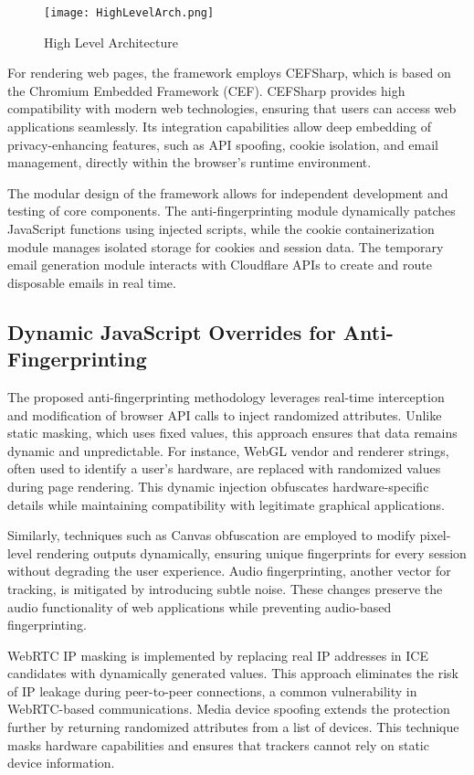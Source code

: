 \documentclass[conference]{IEEEtran}
\begin{document}
\begin{figure}[htbp]
\centerline{\texttt{[image: HighLevelArch.png]}}
\caption{High Level Architecture}
\label{fig}
\end{figure}

For rendering web pages, the framework employs CEFSharp, which is based on the Chromium Embedded Framework (CEF). CEFSharp provides high compatibility with modern web technologies, ensuring that users can access web applications seamlessly. Its integration capabilities allow deep embedding of privacy-enhancing features, such as API spoofing, cookie isolation, and email management, directly within the browser’s runtime environment.

The modular design of the framework allows for independent development and testing of core components. The anti-fingerprinting module dynamically patches JavaScript functions using injected scripts, while the cookie containerization module manages isolated storage for cookies and session data. The temporary email generation module interacts with Cloudflare APIs to create and route disposable emails in real time.

\subsection{Dynamic JavaScript Overrides for Anti-Fingerprinting}
The proposed anti-fingerprinting methodology leverages real-time interception and modification of browser API calls to inject randomized attributes. Unlike static masking, which uses fixed values, this approach ensures that data remains dynamic and unpredictable. For instance, WebGL vendor and renderer strings, often used to identify a user’s hardware, are replaced with randomized values during page rendering. This dynamic injection obfuscates hardware-specific details while maintaining compatibility with legitimate graphical applications.

Similarly, techniques such as Canvas obfuscation are employed to modify pixel-level rendering outputs dynamically, ensuring unique fingerprints for every session without degrading the user experience. Audio fingerprinting, another vector for tracking, is mitigated by introducing subtle noise. These changes preserve the audio functionality of web applications while preventing audio-based fingerprinting.

WebRTC IP masking is implemented by replacing real IP addresses in ICE candidates with dynamically generated values. This approach eliminates the risk of IP leakage during peer-to-peer connections, a common vulnerability in WebRTC-based communications. Media device spoofing extends the protection further by returning randomized attributes from a list of devices. This technique masks hardware capabilities and ensures that trackers cannot rely on static device information.
\end{document}
